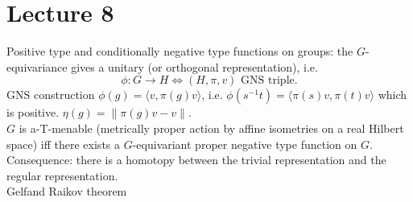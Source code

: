\section{Lecture 8}
Positive type and conditionally negative type functions on groups: the $G$-equivariance gives a unitary (or orthogonal representation), i.e.
\[\phi: G\rightarrow H \iff (H,\pi,v) \text{ GNS triple}.\] 
GNS construction $\phi(g) = \langle v,\pi(g)v\rangle$, i.e. $\phi(s^{-1}t) = \langle \pi(s)v,\pi(t)v\rangle$ which is positive. $\eta(g)= \|\pi(g)v -v\|$. \\

$G$ is a-T-menable (metrically proper action by affine isometries on a real Hilbert space) iff there exists a $G$-equivariant proper negative type function on $G$.\\

Consequence: there is a homotopy between the trivial representation and the regular representation.\\

Gelfand Raikov theorem
